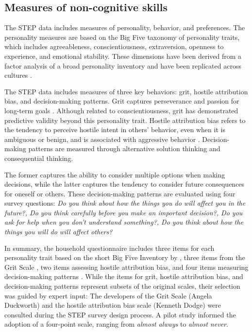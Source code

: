 \subsection{Measures of non-cognitive skills}
The STEP data includes measures of personality, behavior, and preferences. The personality measures are based on the Big Five taxonomy of personality traits, which includes agreeableness, conscientiousness, extraversion, openness to experience, and emotional stability. These dimensions have been derived from a factor analysis of a broad personality inventory and have been replicated across cultures \parencite{allport_trait-names_1936, john_big_1999, almlund_chapter_2011}.

The STEP data includes measures of three key behaviors: grit, hostile attribution bias, and decision-making patterns. Grit captures perseverance and passion for long-term goals \parencite{duckworth_grit_2007}. Although related to conscientiousness, grit has demonstrated predictive validity beyond this personality trait. Hostile attribution bias refers to the tendency to perceive hostile intent in others' behavior, even when it is ambiguous or benign, and is associated with aggressive behavior \parencite{dodge_social_2003, dodge_translational_2006}. Decision-making patterns are measured through alternative solution thinking and consequential thinking.

The former captures the ability to consider multiple options when making decisions, while the latter captures the tendency to consider future consequences for oneself or others. These decision-making patterns are evaluated using four survey questions: \textit{Do you think about how the things you do will affect you in the future?, Do you think carefully before you make an important decision?, Do you ask for help when you don’t understand something?, Do you think about how the things you will do will affect others?}



In summary, the household questionnaire includes three items for each personality trait based on the short Big Five Inventory by \citet{john_big_1999} \parencite[see][for a validation]{lang_short_2011}, three items from the Grit Scale \parencite{duckworth_grit_2007}, two items assessing hostile attribution bias, and four items measuring decision-making patterns \parencite{mann_melbourne_1997}. While the items for grit, hostile attribution bias, and decision-making patterns represent subsets of the original scales, their selection was guided by expert input: The developers of the Grit Scale (Angela Duckworth) and the hostile attribution bias scale (Kenneth Dodge) were consulted during the STEP survey design process. A pilot study informed the adoption of a four-point scale, ranging from \textit{almost always} to \textit{almost never}.

